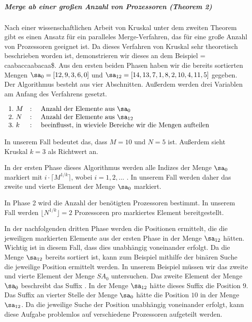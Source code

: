 \subparagraph*{Merge ab einer großen Anzahl von Prozessoren (Theorem 2)}
Nach einer wissenschaftlichen Arbeit von Kruskal \cite[p.~943,944]{merge:kruskal} unter dem zweiten Theorem gibt es einen Ansatz für ein paralleles Merge-Verfahren, das für eine große Anzahl von Prozessoren geeignet ist.
Da dieses Verfahren von Kruskal sehr theoretisch beschrieben worden ist, demonstrieren wir dieses an dem Beispiel  = caabaccaabacaa\$. Aus den ersten beiden Phasen haben wir die bereits sortierten Mengen $\sa_{0} = [12, 9, 3, 6, 0]$ und $\sa_{12} = [14, 13, 7, 1, 8, 2, 10, 4, 11, 5]$ gegeben.
Der Algorithmus besteht aus vier Abschnitten. Außerdem werden drei Variablen am Anfang des Verfahrens gesetzt.

$\begin{array}{lcl}
1. \text{  } M & : & \text{ Anzahl der Elemente aus } \sa_0 \\
2. \text{  } N	& : & \text{ Anzahl der Elemente aus } \sa_{12} \\
3. \text{  } k & : & \text{ beeinflusst, in wieviele Bereiche wir die Mengen aufteilen}
\end{array}$

In unserem Fall bedeutet das, dass $M = 10$ und $N = 5$ ist. Außerdem sieht Kruskal $k = 3$ als Richtwert an.

In der ersten Phase dieses Algorithmus werden alle Indizes der Menge $\sa_0$ markiert mit $i \cdot \lceil M^{1/k} \rceil$, wobei $i = 1, 2, ...$ . In unserem Fall werden daher das zweite und vierte Element der Menge $\sa_0$ markiert.

In Phase 2 wird die Anzahl der benötigten Prozessoren bestimmt. In unserem Fall werden $\lfloor N^{1/k} \rfloor = 2$ Prozessoren pro markiertes Element bereitgestellt.

In der nachfolgenden dritten Phase werden die Positionen ermittelt, die die jeweiligen markierten Elemente aus der ersten Phase in der Menge $\sa_{12}$ hätten. Wichtig ist in diesem Fall, dass dies unabhängig voneinander erfolgt. Da die Menge $\sa_{12}$ bereits sortiert ist, kann zum Beispiel mithilfe der binären Suche die jeweilige Position ermittelt werden. In unserem Beispiel müssen wir das zweite und vierte Element der Menge $SA_0$ untersuchen. Das zweite Element der Menge $\sa_0$ beschreibt das Suffix . In der Menge $\sa_{12}$ hätte dieses Suffix die Position $9$. Das Suffix  an vierter Stelle der Menge $\sa_0$ hätte die Position $10$ in der Menge $\sa_{12}$.
Da die jeweilige Suche der Position unabhängig voneinander erfolgt, kann diese Aufgabe problemlos auf verschiedene Prozessoren aufgeteilt werden.

